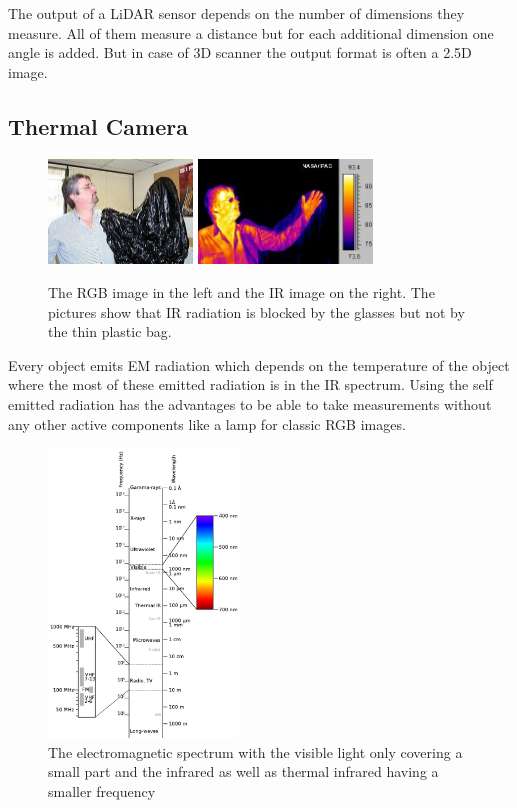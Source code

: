 The output of a \ac{LiDAR} sensor depends on the number of dimensions they measure.
All of them measure a distance but for each additional dimension one angle is added.
But in case of 3D scanner the output format is often a 2.5D image.

\subsection{Thermal Camera}\label{ssec:thermalCamera}

\begin{figure}
	\centering
	\includegraphics[height=2.8cm]{img/fundamentals/Human-Visible.jpg}
	\includegraphics[height=2.8cm]{img/fundamentals/Human-Infrared.jpg}

	\caption{The RGB image in the left and the IR image on the right. The pictures show that IR radiation is blocked by the glasses but not by the thin plastic bag.}
	\label{fig:humanIRVIS}
\end{figure}

Every object emits \ac{EM} radiation which depends on the temperature of the object where the most of these emitted radiation is in the \ac{IR} spectrum.
Using the self emitted radiation has the advantages to be able to take measurements without any other active components like a lamp for classic RGB images.

\begin{figure}
	\centering
	\includegraphics[width=0.45\textwidth]{img/fundamentals/em_spectrum.png}
	\caption{The electromagnetic spectrum with the visible light only covering a small part and the infrared as well as thermal infrared having a smaller frequency \cite{spectrum}
	}
	\label{fig:spectrum}
\end{figure}

